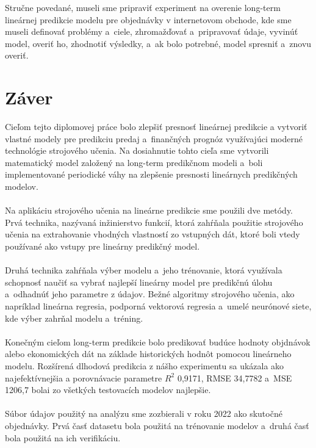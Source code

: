     Stručne povedané, museli sme pripraviť experiment na overenie long-term lineárnej predikcie modelu pre objednávky v
    internetovom obchode, kde sme museli definovať problémy a~ciele, zhromažďovať a~pripravovať údaje, vyvinúť model,
    overiť ho, zhodnotiť výsledky, a~ak bolo potrebné, model spresniť a~znovu overiť.

    \section{Záver}
    Cieľom tejto diplomovej práce bolo zlepšiť presnosť lineárnej predikcie
    a vytvoriť vlastné modely pre predikciu predaj a~finančných prognóz využívajúci moderné technológie
    strojového učenia. Na dosiahnutie tohto cieľa sme vytvorili matematický model založený na long-term
    predikčnom modeli a~boli implementované periodické váhy na zlepšenie presnosti lineárnych predikčných modelov.\\
    \\
    Na aplikáciu strojového učenia na lineárne predikcie sme použili dve metódy. Prvá technika,
    nazývaná inžinierstvo funkcií, ktorá zahŕňala použitie strojového učenia na extrahovanie vhodných
    vlastností zo vstupných dát, ktoré boli vtedy používané ako vstupy pre lineárny predikčný
    model.\\
    \\
    Druhá technika zahŕňala výber modelu a~jeho trénovanie, ktorá využívala schopnosť
    naučiť sa vybrať najlepší lineárny model pre predikčnú úlohu a~odhadnúť jeho
    parametre z údajov. Bežné algoritmy strojového učenia, ako napríklad lineárna regresia,
    podporná vektorová regresia a~umelé neurónové siete, kde výber zahrňal modelu a~tréning.\\
    \\
    Konečným cieľom long-term predikcie bolo predikovať budúce hodnoty
    objdnávok alebo ekonomických dát na základe historických hodnôt pomocou
    lineárneho modelu. Rozšírená dlhodová predikcia z nášho experimentu sa ukázala ako
    najefektívnejšia a porovnávacie parametre $R^2$ 0,9171, RMSE 34,7782 a~MSE 1206,7 bolai zo všetkých
    testovacích modelov najlepšie.\\
    \\
    Súbor údajov použitý na analýzu sme zozbierali v roku 2022 ako skutočné objednávky. Prvá
    časť datasetu bola použitá na trénovanie modelov a~druhá časť bola použitá na
    ich verifikáciu.\\
    \\
